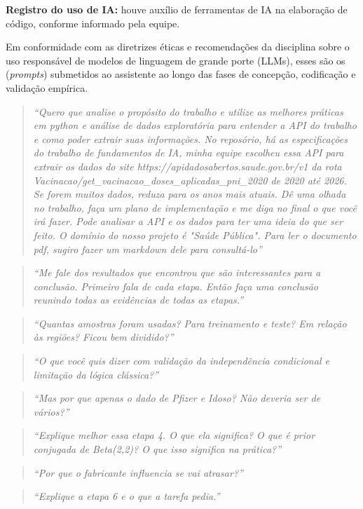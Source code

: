 \documentclass[12pt]{article}
\begin{document}
\textbf{Registro do uso de IA:} houve auxílio de ferramentas de IA na elaboração de código, conforme informado pela equipe.

Em conformidade com as diretrizes éticas e recomendações da disciplina sobre o uso responsável de modelos de linguagem de grande porte (LLMs), esses são os (\textit{prompts}) submetidos ao assistente ao longo das fases de concepção, codificação e validação empírica.

\begin{quote}
\small
\textit{``Quero que analise o propósito do trabalho e utilize as melhores práticas em python e análise de dados exploratória para entender a API do trabalho e como poder extrair suas informações. No reposório, há as especificações do trabalho de fundamentos de IA, minha equipe escolheu essa API para extrair os dados do site  https://apidadosabertos.saude.gov.br/v1 da rota Vacinacao/get\_vacinacao\_doses\_aplicadas\_pni\_2020 de 2020 até 2026. Se forem muitos dados, reduza para os anos mais atuais. Dê uma olhada no trabalho, faça um plano de implementação e me diga no final o que você irá fazer. Pode analisar a API e os dados para ter uma ideia do que ser feito. O domínio do nosso projeto é "Saúde Pública". Para ler o documento pdf, sugiro fazer um markdown dele para consultá-lo''}
\end{quote}

\begin{quote}
\small
\textit{``Me fale dos resultados que encontrou que são interessantes para a conclusão. Primeiro fala de cada etapa. Então faça uma conclusão reunindo todas as evidências de todas as etapas.''}
\end{quote}

\begin{quote}
\small
\textit{``Quantas amostras foram usadas? Para treinamento e teste? Em relação às regiões? Ficou bem dividido?''}
\end{quote}

\begin{quote}
\small
\textit{``O que você quis dizer com validação da independência condicional e limitação da lógica clássica?''}
\end{quote}

\begin{quote}
\small
\textit{``Mas por que apenas o dado de Pfizer e Idoso? Não deveria ser de vários?''}
\end{quote}

\begin{quote}
\small
\textit{``Explique melhor essa etapa 4. O que ela significa? O que é prior conjugada de Beta(2,2)? O que isso significa na prática?''}
\end{quote}

\begin{quote}
\small
\textit{``Por que o fabricante influencia se vai atrasar?''}
\end{quote}

\begin{quote}
\small
\textit{``Explique a etapa 6 e o que a tarefa pedia.''}
\end{quote}



\end{document}
